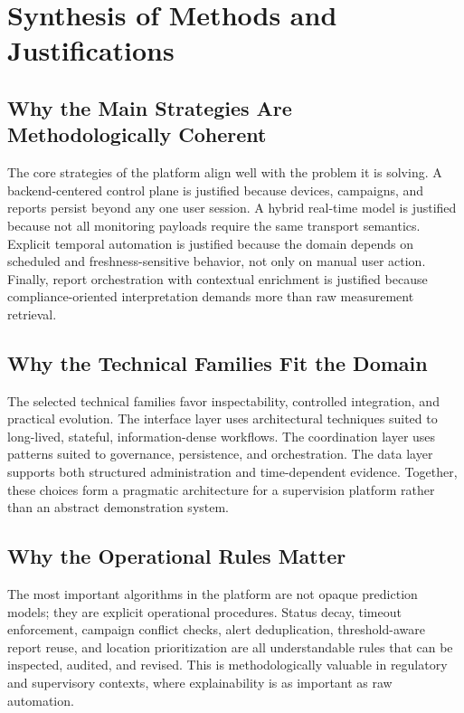 \documentclass[11pt,a4paper]{article}
\begin{document}
\section{Synthesis of Methods and Justifications}

\subsection{Why the Main Strategies Are Methodologically Coherent}
The core strategies of the platform align well with the problem it is solving. A backend-centered control plane is justified because devices, campaigns, and reports persist beyond any one user session. A hybrid real-time model is justified because not all monitoring payloads require the same transport semantics. Explicit temporal automation is justified because the domain depends on scheduled and freshness-sensitive behavior, not only on manual user action. Finally, report orchestration with contextual enrichment is justified because compliance-oriented interpretation demands more than raw measurement retrieval.

\subsection{Why the Technical Families Fit the Domain}
The selected technical families favor inspectability, controlled integration, and practical evolution. The interface layer uses architectural techniques suited to long-lived, stateful, information-dense workflows. The coordination layer uses patterns suited to governance, persistence, and orchestration. The data layer supports both structured administration and time-dependent evidence. Together, these choices form a pragmatic architecture for a supervision platform rather than an abstract demonstration system.

\subsection{Why the Operational Rules Matter}
The most important algorithms in the platform are not opaque prediction models; they are explicit operational procedures. Status decay, timeout enforcement, campaign conflict checks, alert deduplication, threshold-aware report reuse, and location prioritization are all understandable rules that can be inspected, audited, and revised. This is methodologically valuable in regulatory and supervisory contexts, where explainability is as important as raw automation.
\end{document}
